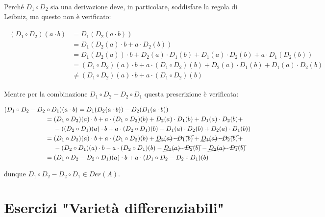 Perché $ D_{1} \circ D_{2} $ sia una derivazione deve, in particolare, soddisfare la regola di Leibniz, ma questo non è verificato:

\begin{align}
	\begin{split}
		(D_{1} \circ D_{2})(a \cdot b) &= D_{1}(D_{2}(a \cdot b))\\
		&= D_{1}( D_{2}(a) \cdot b + a \cdot D_{2}(b) )\\
		&= D_{1}(D_{2}(a)) \cdot b + D_{2}(a) \cdot D_{1}(b) + D_{1}(a) \cdot D_{2}(b) + a \cdot D_{1}(D_{2}(b))\\
		&= (D_{1} \circ D_{2})(a) \cdot b + a \cdot (D_{1} \circ D_{2})(b) + D_{2}(a) \cdot D_{1}(b) + D_{1}(a) \cdot D_{2}(b)\\
		&\neq (D_{1} \circ D_{2})(a) \cdot b + a \cdot (D_{1} \circ D_{2})(b)
	\end{split}
\end{align}

Mentre per la combinazione $ D_{1} \circ D_{2} - D_{2} \circ D_{1} $ questa prescrizione è verificata:

\begin{align}
	\begin{split}
		(D_{1} \circ D_{2} - D_{2} &\circ D_{1})(a \cdot b) = D_{1}(D_{2}(a \cdot b)) - D_{2}(D_{1}(a \cdot b))\\
		&= (D_{1} \circ D_{2})(a) \cdot b + a \cdot (D_{1} \circ D_{2})(b) + D_{2}(a) \cdot D_{1}(b) + D_{1}(a) \cdot D_{2}(b) +\\
		& \hspace{13px} - ((D_{2} \circ D_{1})(a) \cdot b + a \cdot (D_{2} \circ D_{1})(b) + D_{1}(a) \cdot D_{2}(b) + D_{2}(a) \cdot D_{1}(b))\\
		&= (D_{1} \circ D_{2})(a) \cdot b + a \cdot (D_{1} \circ D_{2})(b) + \cancel{ D_{2}(a) \cdot D_{1}(b) } + \cancel{ D_{1}(a) \cdot D_{2}(b) } +\\
		& \hspace{13px} - (D_{2} \circ D_{1})(a) \cdot b - a \cdot (D_{2} \circ D_{1})(b) - \cancel{ D_{1}(a) \cdot D_{2}(b) } - \cancel{ D_{2}(a) \cdot D_{1}(b) }\\
		&= (D_{1} \circ D_{2} - D_{2} \circ D_{1})(a) \cdot b + a \cdot (D_{1} \circ D_{2} - D_{2} \circ D_{1})(b)
	\end{split}
\end{align}

dunque $ D_{1} \circ D_{2} - D_{2} \circ D_{1} \in Der(A) $.

\chapter{Esercizi "Varietà differenziabili"}

